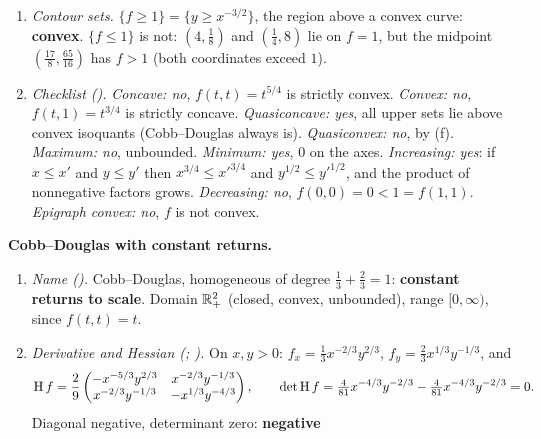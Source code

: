 \begin{solutions}
\begin{enumerate}[label=(\alph*),leftmargin=1.8em,itemsep=0.4ex]
                exist.)
          \item \emph{Contour sets.} $\{f\ge1\}=\{y\ge x^{-3/2}\}$, the
                region above a convex curve: \textbf{convex}. $\{f\le1\}$ is
                not: $(4,\tfrac18)$ and $(\tfrac14,8)$ lie on $f=1$, but the
                midpoint $(\tfrac{17}{8},\tfrac{65}{16})$ has
                $f>1$ (both coordinates exceed $1$).
          \item \emph{Checklist ().}
                \emph{Concave: no}, $f(t,t)=t^{5/4}$ is strictly convex.
                \emph{Convex: no}, $f(t,1)=t^{3/4}$ is strictly concave.
                \emph{Quasiconcave: yes}, all upper sets lie above convex
                isoquants (Cobb--Douglas always is).
                \emph{Quasiconvex: no}, by (f).
                \emph{Maximum: no}, unbounded.
                \emph{Minimum: yes}, $0$ on the axes.
                \emph{Increasing: yes}: if $x\le x'$ and $y\le y'$ then
                $x^{3/4}\le x'^{3/4}$ and $y^{1/2}\le y'^{1/2}$, and the
                product of nonnegative factors grows.
                \emph{Decreasing: no}, $f(0,0)=0<1=f(1,1)$.
                \emph{Epigraph convex: no}, $f$ is not convex.
        \end{enumerate}
  \item \textbf{Cobb--Douglas with constant returns.}
        \begin{enumerate}[label=(\alph*),leftmargin=1.8em,itemsep=0.4ex]
          \item \emph{Name ().} Cobb--Douglas, homogeneous of
                degree $\tfrac13+\tfrac23=1$: \textbf{constant returns to
                scale}. Domain $\mathbb{R}^{2}_{+}$ (closed, convex, unbounded),
                range $[0,\infty)$, since $f(t,t)=t$.
          \item \emph{Derivative and Hessian (; ).}
                On $x,y>0$:
                $f_{x}=\tfrac13x^{-2/3}y^{2/3}$,
                $f_{y}=\tfrac23x^{1/3}y^{-1/3}$, and
                \[
                  \operatorname{H} f=\frac29\begin{pmatrix}
                    -x^{-5/3}y^{2/3}& x^{-2/3}y^{-1/3}\\
                    x^{-2/3}y^{-1/3}& -x^{1/3}y^{-4/3}\end{pmatrix},\qquad
                  \det\operatorname{H} f=\tfrac{4}{81}x^{-4/3}y^{-2/3}
                  -\tfrac{4}{81}x^{-4/3}y^{-2/3}=0 .
                \]
                Diagonal negative, determinant zero: \textbf{negative
}
\end{enumerate}
\end{solutions}
